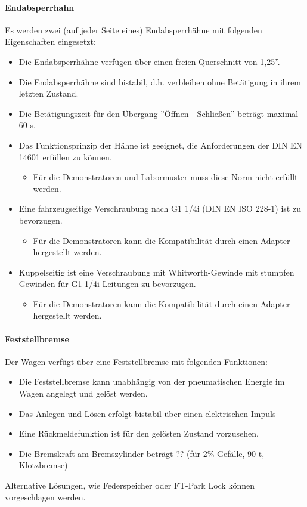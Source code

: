 \paragraph{Endabsperrhahn}
\begin{feat}
Es werden zwei (auf jeder Seite eines) Endabsperrhähne mit folgenden Eigenschaften eingesetzt:
\begin{itemize}
    \item Die Endabsperrhähne verfügen über einen freien Querschnitt von 1,25''.
    \item Die Endabsperrhähne sind bistabil, d.h. verbleiben ohne Betätigung in ihrem letzten Zustand.
    \item Die Betätigungszeit für den Übergang ''Öffnen - Schließen'' beträgt maximal 60 s.
    \item Das Funktionsprinzip der Hähne ist geeignet, die Anforderungen der DIN EN 14601 erfüllen zu können.
    \begin{itemize}
        \item Für die Demonstratoren und Labormuster muss diese Norm nicht erfüllt werden.
    \end{itemize}
    \item Eine fahrzeugseitige Verschraubung nach G1 1/4i (DIN EN ISO 228-1) ist zu bevorzugen.
    \begin{itemize}
        \item Für die Demonstratoren kann die Kompatibilität durch einen Adapter hergestellt werden.
    \end{itemize}
    \item Kuppelseitig ist eine Verschraubung mit Whitworth-Gewinde mit stumpfen Gewinden für G1 1/4i-Leitungen zu bevorzugen.
    \begin{itemize}
        \item Für die Demonstratoren kann die Kompatibilität durch einen Adapter hergestellt werden.
    \end{itemize}
\end{itemize}
\end{feat}

\paragraph{Feststellbremse}
\begin{feat}
Der Wagen verfügt über eine Feststellbremse mit folgenden Funktionen:
\begin{itemize}
    \item Die Feststellbremse kann unabhängig von der pneumatischen Energie im Wagen angelegt und gelöst werden.
    \item Das Anlegen und Lösen erfolgt bistabil über einen elektrischen Impuls
    \item Eine Rückmeldefunktion ist für den gelösten Zustand vorzusehen.
    \item Die Bremskraft am Bremszylinder beträgt ?? (für 2\%-Gefälle, 90 t, Klotzbremse)
\end{itemize}
Alternative Lösungen, wie Federspeicher oder FT-Park Lock können vorgeschlagen werden.
\end{feat}

